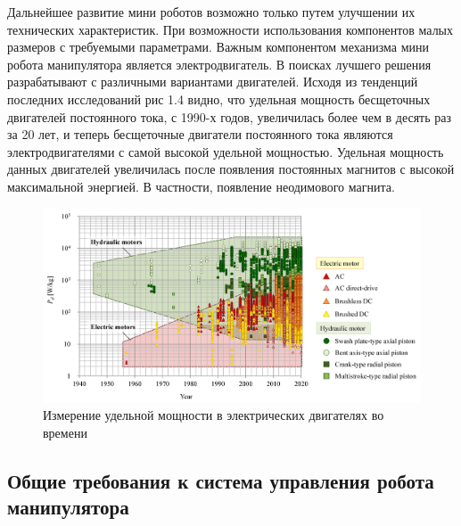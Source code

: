 Дальнейшее развитие мини роботов возможно только путем улучшении  их технических характеристик. При возможности использования компонентов малых размеров с требуемыми параметрами. Важным компонентом механизма мини робота манипулятора является электродвигатель. В поисках лучшего решения разрабатывают с различными вариантами двигателей. Исходя из тенденций последних исследований \citep{Sakama2022} рис 1.4 видно, что удельная мощность бесщеточных двигателей постоянного тока, с 1990-х годов, увеличилась более чем в десять раз за 20 лет, и теперь бесщеточные двигатели постоянного тока являются электродвигателями с самой высокой удельной мощностью. Удельная мощность данных двигателей увеличилась после появления постоянных магнитов с высокой максимальной энергией. В частности, появление неодимового магнита.

\begin{figure}[H]
	\centering
	\includegraphics[width=\textwidth]{Src/images/magnets.png}
	\caption{Измерение удельной мощности в электрических двигателях во времени \citep{Sakama2022}}
\end{figure}

\subsection{ Общие требования к система управления робота манипулятора}

